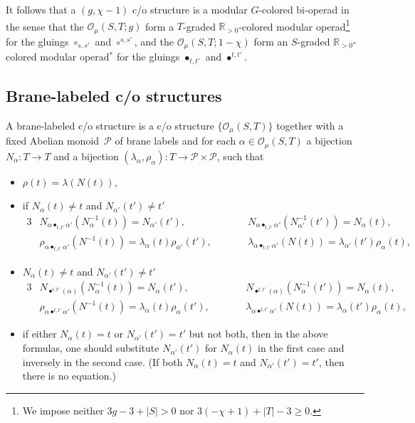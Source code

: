 \documentclass[pdftex]{sigma}
\def\Rp{{\mathbb R}_{>0}}
\def\CO{{\mathcal O_\mu}}
\def\a{\alpha}
\begin{document}
It follows that a $(g,\chi -1)$
c/o structure is a modular $G$-colored bi-operad in the sense that the
 $\CO(S,T;g)$ form a $T$-graded $\Rp$-colored
 modular operad\footnote{We impose
neither  $3g-3+|S|>0$ nor $3(-\chi+1)+|T|-3\geq 0$.} for the  gluings $\circ_{s,s'}$ and
$\circ^{s,s'}$, and the $\CO(S,T;1-\chi)$ form an $S$-graded
$\Rp$-colored  modular operad$^*$ for the gluings $\bullet_{t,t'}$ and
$\bullet^{t,t'}$.



\subsection{Brane-labeled c/o structures}

A  brane-labeled c/o
structure is a c/o structure $\{\CO(S,T)\}$  together with a f\/ixed
Abelian monoid~$\mathcal{P}$ of brane labels and for each $\a\in
\CO(S,T)$ a bijection $N_{\a}:T\rightarrow T$ and a bijection
$(\lambda_{\a},\rho_{\a}): T\rightarrow \mathcal{P} \times
\mathcal{P}$, such that
\begin{itemize}\itemsep=0pt
\item[(1)]
 $\rho(t)=\lambda(N(t))$,
 \item[(2)] if
$N_{\a}(t)\neq t$ and $N_{\a'}(t')\neq t'$
\begin{alignat*}{3}
& N_{\a\bullet_{t,t'}\a'}(N_{\a}^{-1}(t))=N_{\a'}(t'), \qquad &&
N_{\a\bullet_{t,t'}\a'}(N_{\a'}^{-1}(t'))=N_{\a}(t), & \\
& \rho_{\a\bullet_{t,t'}\a'}(N^{-1}(t))=\lambda_{\a}(t)\rho_{\a'}(t'),\qquad &&
\lambda_{\a\bullet_{t,t'}\a'}(N(t))=\lambda_{\a'}(t')\rho_{\a}(t), &
\end{alignat*}

\item[(3)] $N_{\a}(t)\neq t$ and $N_{\a'}(t')\neq t'$
\begin{alignat*}{3}
& N_{\bullet^{t,t'}(\a)}(N_{\a}^{-1}(t))=N_{\a}(t'),\qquad &&
N_{\bullet^{t,t'}(\a)}(N_{\a}^{-1}(t'))=N_{\a}(t), & \\
& \rho_{\a\bullet^{t,t'}\a'}(N^{-1}(t))=\lambda_{\a}(t)\rho_{\a}(t'),\qquad
&&\lambda_{\a\bullet^{t,t'}\a'}(N(t))=\lambda_{\a}(t')\rho_{\a}(t),&
\end{alignat*}

\item[(4)] if either $N_{\a}(t)=t$ or $N_{\a'}(t')=t'$ but not
both, then in the above formulas, one should substitute
 $N_{\a'}(t')$ for $N_{\a}(t)$ in the f\/irst case and inversely in
 the second case. (If both $N_{\a}(t)=t$ and
 $N_{\a'}(t')=t'$, then there is no equation.)
\end{itemize}
\end{document}

